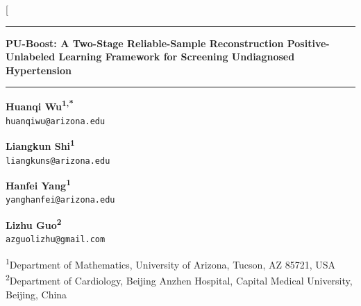 \documentclass[10pt]{article}
\begin{document}
\twocolumn[{
\begin{@twocolumnfalse}
\begin{center}
\begin{minipage}{0.86\textwidth}
\centering
\rule{\linewidth}{2.4pt}
\vspace{9pt}

{\fontsize{19.5}{22.0}\selectfont\bfseries
PU-Boost: A Two-Stage Reliable-Sample Reconstruction Positive-Unlabeled Learning Framework for Screening Undiagnosed Hypertension\par}

\vspace{8pt}
\rule{\linewidth}{1.25pt}
\end{minipage}
\end{center}
\vspace{10pt}

\begin{center}
\begin{minipage}[t]{0.235\textwidth}\centering
{\normalsize\bfseries Huanqi Wu\textsuperscript{1,*}}\\[-1pt]
{\footnotesize\texttt{huanqiwu@arizona.edu}}
\end{minipage}\hfill
\begin{minipage}[t]{0.235\textwidth}\centering
{\normalsize\bfseries Liangkun Shi\textsuperscript{1}}\\[-1pt]
{\footnotesize\texttt{liangkuns@arizona.edu}}
\end{minipage}\hfill
\begin{minipage}[t]{0.235\textwidth}\centering
{\normalsize\bfseries Hanfei Yang\textsuperscript{1}}\\[-1pt]
{\footnotesize\texttt{yanghanfei@arizona.edu}}
\end{minipage}\hfill
\begin{minipage}[t]{0.235\textwidth}\centering
{\normalsize\bfseries Lizhu Guo\textsuperscript{2}}\\[-1pt]
{\footnotesize\texttt{azguolizhu@gmail.com}}
\end{minipage}

\vspace{7pt}
{\footnotesize
\textsuperscript{1}Department of Mathematics, University of Arizona, Tucson, AZ 85721, USA\\
\textsuperscript{2}Department of Cardiology, Beijing Anzhen Hospital, Capital Medical University, Beijing, China}

\end{center}


\end{@twocolumnfalse}}
\end{document}
